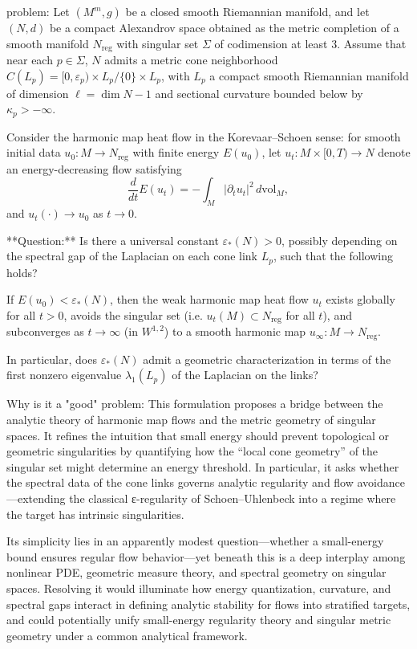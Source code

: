 problem:  
Let \( (M^m, g) \) be a closed smooth Riemannian manifold, and let \( (N,d) \) be a compact Alexandrov space obtained as the metric completion of a smooth manifold \(N_{\mathrm{reg}}\) with singular set \( \Sigma \) of codimension at least \(3\). Assume that near each \( p \in \Sigma \), \(N\) admits a metric cone neighborhood \(C(L_p) = [0,\varepsilon_p) \times L_p / \{0\}\times L_p\), with \(L_p\) a compact smooth Riemannian manifold of dimension \(\ell = \dim N - 1\) and sectional curvature bounded below by \(\kappa_p > -\infty\).  

Consider the harmonic map heat flow in the Korevaar–Schoen sense: for smooth initial data \(u_0 : M \to N_{\mathrm{reg}}\) with finite energy \(E(u_0)\), let \(u_t : M \times [0,T) \to N\) denote an energy-decreasing flow satisfying  
\[
\frac{d}{dt}E(u_t) = - \int_M |\partial_t u_t|^2 \, d\mathrm{vol}_M,
\]
and \(u_t(\cdot) \to u_0\) as \(t \to 0\).  

**Question:**  
Is there a universal constant \( \varepsilon_*(N) > 0 \), possibly depending on the spectral gap of the Laplacian on each cone link \(L_p\), such that the following holds?  

If \(E(u_0) < \varepsilon_*(N)\), then the weak harmonic map heat flow \(u_t\) exists globally for all \(t > 0\), avoids the singular set (i.e. \(u_t(M) \subset N_{\mathrm{reg}}\) for all \(t\)), and subconverges as \(t \to \infty\) (in \(W^{1,2}\)) to a smooth harmonic map \(u_\infty : M \to N_{\mathrm{reg}}\).  

In particular, does \( \varepsilon_*(N) \) admit a geometric characterization in terms of the first nonzero eigenvalue \( \lambda_1(L_p) \) of the Laplacian on the links?  

Why is it a "good" problem:  
This formulation proposes a bridge between the analytic theory of harmonic map flows and the metric geometry of singular spaces. It refines the intuition that small energy should prevent topological or geometric singularities by quantifying how the “local cone geometry” of the singular set might determine an energy threshold. In particular, it asks whether the spectral data of the cone links governs analytic regularity and flow avoidance—extending the classical ε-regularity of Schoen–Uhlenbeck into a regime where the target has intrinsic singularities.  

Its simplicity lies in an apparently modest question—whether a small-energy bound ensures regular flow behavior—yet beneath this is a deep interplay among nonlinear PDE, geometric measure theory, and spectral geometry on singular spaces. Resolving it would illuminate how energy quantization, curvature, and spectral gaps interact in defining analytic stability for flows into stratified targets, and could potentially unify small-energy regularity theory and singular metric geometry under a common analytical framework.
